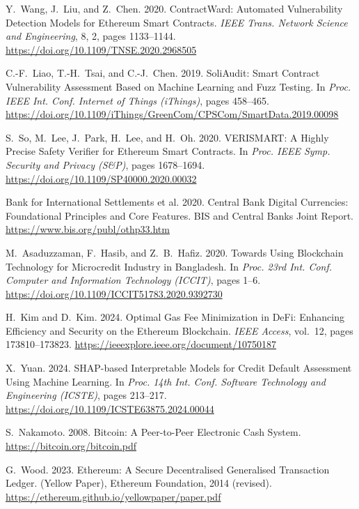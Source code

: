 \documentclass[12pt, a4paper]{report}
\begin{document}
{\begin{enumerate}[label={[\arabic*]}]
\item Y.~Wang, J.~Liu, and Z.~Chen. 2020. ContractWard: Automated Vulnerability Detection Models for Ethereum Smart Contracts. \emph{IEEE Trans. Network Science and Engineering}, 8, 2, pages 1133--1144. \url{https://doi.org/10.1109/TNSE.2020.2968505}

\item C.-F.~Liao, T.-H.~Tsai, and C.-J.~Chen. 2019. SoliAudit: Smart Contract Vulnerability Assessment Based on Machine Learning and Fuzz Testing. In \emph{Proc. IEEE Int. Conf. Internet of Things (iThings)}, pages 458--465. \url{https://doi.org/10.1109/iThings/GreenCom/CPSCom/SmartData.2019.00098}

\item S.~So, M.~Lee, J.~Park, H.~Lee, and H.~Oh. 2020. VERISMART: A Highly Precise Safety Verifier for Ethereum Smart Contracts. In \emph{Proc. IEEE Symp. Security and Privacy (S\&P)}, pages 1678--1694. \url{https://doi.org/10.1109/SP40000.2020.00032}

\item Bank for International Settlements et al. 2020. Central Bank Digital Currencies: Foundational Principles and Core Features. BIS and Central Banks Joint Report. \url{https://www.bis.org/publ/othp33.htm}

\item M.~Asaduzzaman, F.~Hasib, and Z.~B.~Hafiz. 2020. Towards Using Blockchain Technology for Microcredit Industry in Bangladesh. In \emph{Proc. 23rd Int. Conf. Computer and Information Technology (ICCIT)}, pages 1--6. \url{https://doi.org/10.1109/ICCIT51783.2020.9392730}

\item H.~Kim and D.~Kim. 2024. Optimal Gas Fee Minimization in DeFi: Enhancing Efficiency and Security on the Ethereum Blockchain. \emph{IEEE Access}, vol.~12, pages 173810--173823. \url{https://ieeexplore.ieee.org/document/10750187}

\item X.~Yuan. 2024. SHAP-based Interpretable Models for Credit Default Assessment Using Machine Learning. In \emph{Proc. 14th Int. Conf. Software Technology and Engineering (ICSTE)}, pages 213--217. \url{https://doi.org/10.1109/ICSTE63875.2024.00044}

\item S.~Nakamoto. 2008. Bitcoin: A Peer-to-Peer Electronic Cash System. \url{https://bitcoin.org/bitcoin.pdf}

\item G.~Wood. 2023. Ethereum: A Secure Decentralised Generalised Transaction Ledger. (Yellow Paper), Ethereum Foundation, 2014 (revised). \url{https://ethereum.github.io/yellowpaper/paper.pdf}


\end{enumerate}}
\end{document}
